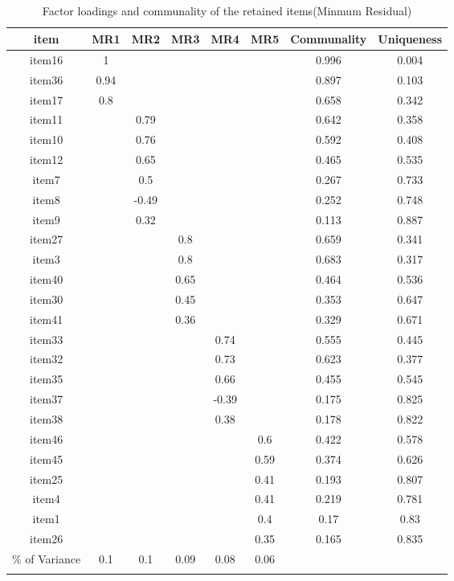 \documentclass[
  english,
  man]{apa6}
\begin{document}
\begin{appendix}
\section{}
\begin{table}[tbp]

\begin{center}
\begin{threeparttable}

\caption{\label{tab:MinResTab-33}Factor loadings and communality of the retained items(Minmum Residual)}

\small{

\begin{tabular}{cccccccc}
\toprule
item & \multicolumn{1}{c}{MR1} & \multicolumn{1}{c}{MR2} & \multicolumn{1}{c}{MR3} & \multicolumn{1}{c}{MR4} & \multicolumn{1}{c}{MR5} & \multicolumn{1}{c}{Communality} & \multicolumn{1}{c}{Uniqueness}\\
\midrule
item16 & 1 &  &  &  &  & 0.996 & 0.004\\
item36 & 0.94 &  &  &  &  & 0.897 & 0.103\\
item17 & 0.8 &  &  &  &  & 0.658 & 0.342\\
item11 &  & 0.79 &  &  &  & 0.642 & 0.358\\
item10 &  & 0.76 &  &  &  & 0.592 & 0.408\\
item12 &  & 0.65 &  &  &  & 0.465 & 0.535\\
item7 &  & 0.5 &  &  &  & 0.267 & 0.733\\
item8 &  & -0.49 &  &  &  & 0.252 & 0.748\\
item9 &  & 0.32 &  &  &  & 0.113 & 0.887\\
item27 &  &  & 0.8 &  &  & 0.659 & 0.341\\
item3 &  &  & 0.8 &  &  & 0.683 & 0.317\\
item40 &  &  & 0.65 &  &  & 0.464 & 0.536\\
item30 &  &  & 0.45 &  &  & 0.353 & 0.647\\
item41 &  &  & 0.36 &  &  & 0.329 & 0.671\\
item33 &  &  &  & 0.74 &  & 0.555 & 0.445\\
item32 &  &  &  & 0.73 &  & 0.623 & 0.377\\
item35 &  &  &  & 0.66 &  & 0.455 & 0.545\\
item37 &  &  &  & -0.39 &  & 0.175 & 0.825\\
item38 &  &  &  & 0.38 &  & 0.178 & 0.822\\
item46 &  &  &  &  & 0.6 & 0.422 & 0.578\\
item45 &  &  &  &  & 0.59 & 0.374 & 0.626\\
item25 &  &  &  &  & 0.41 & 0.193 & 0.807\\
item4 &  &  &  &  & 0.41 & 0.219 & 0.781\\
item1 &  &  &  &  & 0.4 & 0.17 & 0.83\\
item26 &  &  &  &  & 0.35 & 0.165 & 0.835\\
\% of Variance & 0.1 & 0.1 & 0.09 & 0.08 & 0.06 &  & \\
\bottomrule
\addlinespace
\end{tabular}

}
\end{threeparttable}
\end{center}
\end{table}
\end{appendix}
\end{document}
